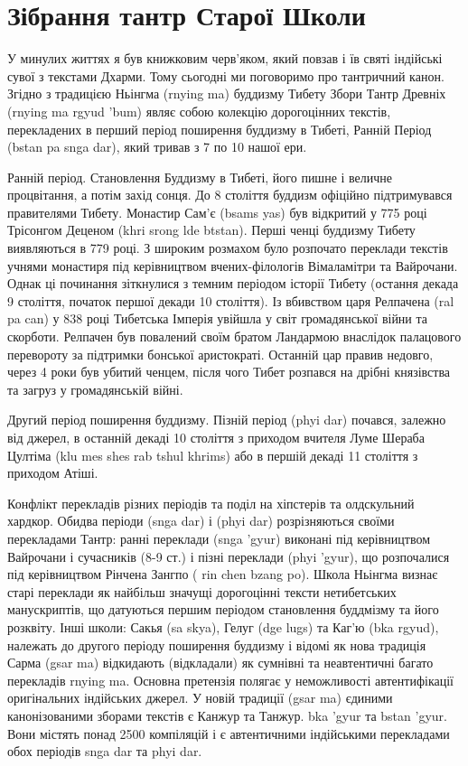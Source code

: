 \section{Зібрання тантр Старої Школи}
 
У минулих життях я був книжковим черв'яком, який повзав
і їв святі індійські сувої з текстами Дхарми. Тому сьогодні
ми поговоримо про тантричний канон. Згідно з традицією
Ньінгма (rnying ma) буддизму Тибету Збори Тантр
Древніх (rnying ma rgyud 'bum) являє собою колекцію
дорогоцінних текстів, перекладених в перший період поширення
буддизму в Тибеті, Ранній Період (bstan pa snga dar),
який тривав з 7 по 10 нашої ери.

Ранній період. Становлення Буддизму в Тибеті, його пишне
і величне процвітання, а потім захід сонця. До 8 століття
буддизм офіційно підтримувався правителями Тибету. Монастир
Сам'є (bsams yas) був відкритий у 775 році Трісонгом
Деценом (khri srong lde btstan). Перші ченці буддизму
Тибету виявляються в 779 році. З широким розмахом було
розпочато переклади текстів учнями монастиря під керівництвом
вчених-філологів Вімаламітри та Вайрочани. Однак ці починання
зіткнулися з темним періодом історії Тибету (остання декада
9 століття, початок першої декади 10 століття). Із вбивством
царя Релпачена (ral pa can) у 838 році Тибетська Імперія
увійшла у світ громадянської війни та скорботи. Релпачен
був повалений своїм братом Ландармою внаслідок палацового
перевороту за підтримки бонської аристократі. Останній
цар правив недовго, через 4 роки був убитий ченцем, після
чого Тибет розпався на дрібні князівства та загруз у громадянській війні.

Другий період поширення буддизму. Пізній період (phyi dar) почався,
залежно від джерел, в останній декаді 10 століття з приходом
вчителя Луме Шераба Цултіма (klu mes shes rab tshul khrims) або
в першій декаді 11 століття з приходом Атіші.

Конфлікт перекладів різних періодів та поділ на хіпстерів та олдскульний хардкор.
Обидва періоди (snga dar) і (phyi dar) розрізняються своїми перекладами
Тантр: ранні переклади (snga 'gyur) виконані під керівництвом Вайрочани
і сучасників (8-9 ст.) і пізні переклади (phyi 'gyur), що розпочалися
під керівництвом Рінчена Зангпо ( rin chen bzang po). Школа Ньінгма
визнає старі переклади як найбільш значущі дорогоцінні тексти нетибетських
манускриптів, що датуються першим періодом становлення буддмізму та його
розквіту. Інші школи: Сакья (sa skya), Гелуг (dge lugs) та Каг'ю (bka rgyud),
належать до другого періоду поширення буддизму і відомі як нова традиція
Сарма (gsar ma) відкидають (відкладали) як сумнівні та неавтентичні багато
перекладів rnying ma. Основна претензія полягає у неможливості
автентифікації оригінальних індійських джерел. У новій традиції (gsar ma)
єдиними канонізованими зборами текстів є Канжур та Танжур. bka 'gyur та bstan 'gyur.
Вони містять понад 2500 компіляцій і є автентичними індійськими
перекладами обох періодів snga dar та phyi dar.

